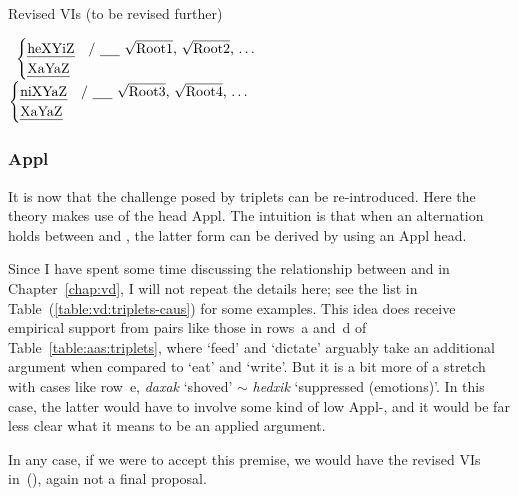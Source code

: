 \begin{exe}
\begin{xlist}
\begin{exe}
\begin{exe}
\begin{xlist}
\begin{exe}
\begin{exe}
\begin{exe}
\begin{exe}
\begin{exe}
\begin{xlist}
\begin{exe}
\begin{exe}
\begin{xlist}
 \begin{exe}
 \ex  Revised VIs (to be revised further) 
 \begin{xlist} 
 	\ex  {\vds} \lra~$\begin{cases} 
		\text{\thif} & \text{/ \trace~\root{Root1}, \root{Root2}, \dots}\\
		\text{\tkal} & \\
		\end{cases}$
 	\ex  {\vzs} \lra~$\begin{cases} 
		\text{\tnif} & \text{/ \trace~\root{Root3}, \root{Root4}, \dots}\\
		\text{\tkal} & \\
		\end{cases}$
 \z
\z 


		\subsubsection{Appl}
It is now that the challenge posed by triplets can be re-introduced. Here the theory makes use of the  head Appl. The intuition is that when an alternation holds between {\tkal} and {\thif}, the latter form can be derived by using an Appl head.

Since I have spent some time discussing the relationship between {\tkal} and {\thif} in Chapter~\ref{chap:vd}, I will not repeat the details here; see the list in Table~(\ref{table:vd:triplets-caus}) for some examples. This idea does receive empirical support from pairs like those in rows~a and~d of Table~\ref{table:aas:triplets}, where `feed' and `dictate' arguably take an additional argument when compared to `eat' and `write'. But it is a bit more of a stretch with cases like row~e, \emph{daxak} `shoved' $\sim$ \emph{hedxik} `suppressed (emotions)'. In this case, the latter would have to involve some kind of low Appl-, and it would be far less clear what it means to be an applied argument.

In any case, if we were to accept this premise, we would have the revised VIs in~(\nextx), again not a final proposal.


\end{xlist}
\end{exe}
\end{xlist}
\end{exe}
\end{exe}
\end{xlist}
\end{exe}
\end{exe}
\end{exe}
\end{exe}
\end{exe}
\end{xlist}
\end{exe}
\end{exe}
\end{xlist}
\end{exe}
